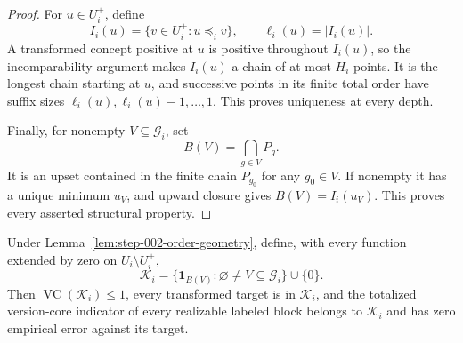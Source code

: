 \begin{proof}
For \(u\in U_i^+\), define
\begin{equation}\label{eq:step-002-upset-depth}
I_i(u)=\{v\in U_i^+:u\preceq_i v\},
\qquad \ell_i(u)=|I_i(u)|.
\end{equation}
A transformed concept positive at \(u\) is positive throughout \(I_i(u)\),
so the incomparability argument makes \(I_i(u)\) a chain of at most
\(H_i\) points.  It is the longest chain starting at \(u\), and successive
points in its finite total order have suffix sizes
\(\ell_i(u),\ell_i(u)-1,\ldots,1\).  This proves uniqueness at every depth.

Finally, for nonempty \(V\subseteq\mathcal G_i\), set
\begin{equation}\label{eq:step-002-core}
B(V)=\bigcap_{g\in V}P_g.
\end{equation}
It is an upset contained in the finite chain \(P_{g_0}\) for any
\(g_0\in V\).  If nonempty it has a unique minimum \(u_V\), and upward
closure gives \(B(V)=I_i(u_V)\).  This proves every asserted structural
property.
\end{proof}

\begin{lemma}
\label{lem:step-002-core-vc}
Under Lemma~\ref{lem:step-002-order-geometry}, define, with every function
extended by zero on \(U_i\setminus U_i^+\),
\begin{equation}\label{eq:step-002-core-class}
\mathcal K_i=
\{\mathbf1_{B(V)}:\varnothing\ne V\subseteq\mathcal G_i\}\cup\{0\}.
\end{equation}
Then \(\operatorname{VC}(\mathcal K_i)\le1\), every transformed target is
in \(\mathcal K_i\), and the totalized version-core indicator of every
realizable labeled block belongs to \(\mathcal K_i\) and has zero empirical
error against its target.
\end{lemma}

